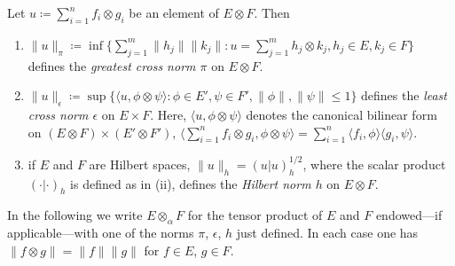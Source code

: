 Let $u \coloneqq \sum_{i=1}^{n} f_{i} \otimes g_{i}$ be an element of $E \otimes F$. 
Then
\begin{enumerate}[\upshape(i), wide, labelindent=.5em]

\item
$\|u\|_{\pi} \coloneqq \inf\{\sum_{j=1}^{m} \|h_{j}\|\|k_{j}\| \colon u = \sum_{j=1}^{m}h_{j} \otimes k_{j}, h_{j} \in E, k_{j} \in F\}$ defines the \emph{greatest cross norm $\pi$} on $E \otimes F$.

\item
$\|u\|_{\epsilon} \coloneqq \sup\{\langle u,\phi \otimes \psi\rangle \colon \phi \in E', \psi \in F', \|\phi\|, \|\psi\| \leq 1\}$ defines the 
\emph{least cross norm $\epsilon$} on $E \times F$. 
Here, $\langle u,\phi \otimes \psi\rangle$ denotes the canonical bilinear form on $(E \otimes F) \times (E' \otimes F')$, \ie $\langle\sum_{i=1}^{n} f_{i} \otimes g_{i},\phi \otimes \psi\rangle = \sum_{i=1}^{n} \langle f_{i},\phi\rangle\langle g_{i},\psi\rangle$.

\item
if $E$ and $F$ are Hilbert spaces, $\|u\|_{h} = (u|u)_{h}^{1/2}$, where the scalar product $(\cdot|\cdot)_{h}$ is defined as in (ii), defines the \emph{Hilbert norm $h$} on $E \otimes F$.
\end{enumerate}
In the following we write $E \otimes_{\alpha} F$ for the tensor product of $E$ and $F$ endowed---if applicable---with one of the norms $\pi$, $\epsilon$, $h$ just defined.
In each case one has $\|f \otimes g\| = \|f\|\|g\|$ for $f \in E$, $g \in F$.

